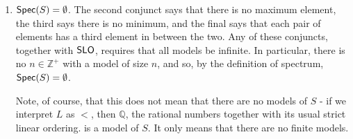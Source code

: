 \begin{mdframed}[linewidth=1]
\begin{enumerate}
    \item $\mbox{$\mathsf{Spec}(S)$} = \emptyset$. The second conjunct says that there is no maximum element, the third says there is no minimum, and the final says that each pair of elements has a third element in between the two. Any of these conjuncts, together with $\mbox{$\mathsf{SLO}$}$, requires that all models be infinite. In particular, there is no $n \in \mathbb{Z}^+$ with a model of size $n$, and so, by the definition of spectrum, $\mbox{$\mathsf{Spec}(S)$} = \emptyset$. 

   Note, of course, that this does not mean that there are no models of $S$ - if we interpret $L$ as $<$, then $\mathbb{Q}$, the rational numbers together with its usual strict linear ordering. is a model of $S$. It only means that there are no finite models. 
\iffalse
    \item $\spec{S} = \{2i + 1 | i \in \mathbb{N}\}$. 

   The first schema says that, for all $x$, either $x$ is related to no element, or $x$ is related to exactly two elements. 

   The second schema says that $L$ is asymmetric. 

   The third schema says that there is an element which is not related to by anything, and that all other elements are related to by exactly one element.

   It follows that models of $S$ look like rooted, directed trees in which every node has either two children or no children. Since each parent corresponds to an even number of children and the only non-child node is the root node, there must be an odd number of nodes. Moreover, we may construct, for each $n$, a structure $T_n$ satisfying $S$ with $2n+1$ nodes. $T_0$ is a single isolated root node. Given $T_n$, we construct $T_{n+1}$ by adding two nodes as children of the leftmost leaf of $T_n$. The result now follows. 
 \fi  
\end{enumerate}
\end{mdframed}